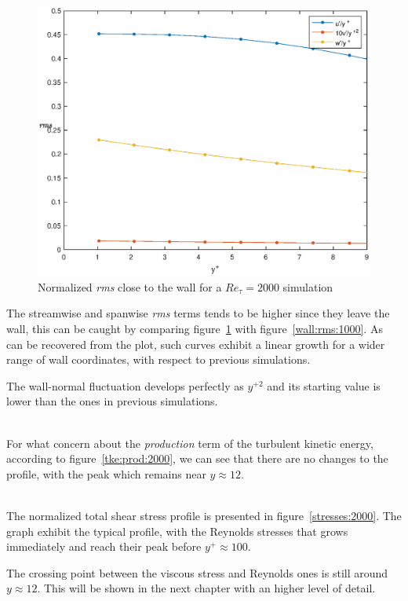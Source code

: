 \begin{figure}
\begin{center}
\includegraphics[scale=0.55]{grafici/wall_rms_2000.eps}
\caption{Normalized \emph{rms} close to the wall for a $Re_{\tau}=2000$ simulation}
\label{wall:rms:2000}
\end{center} 
\end{figure}

The streamwise and spanwise \emph{rms} terms tends to be higher since they leave the wall, this can be caught by comparing figure~\ref{wall:rms:2000} with figure~\ref{wall:rms:1000}. As can be recovered from the plot, such curves exhibit a linear growth for a wider range of wall coordinates, with respect to previous simulations. \par
The wall-normal fluctuation develops perfectly as $y^{+2}$ and its starting value is lower than the ones in previous simulations.\\~\par


For what concern about the \emph{production} term of the turbulent kinetic energy, according to figure~\ref{tke:prod:2000}, we can see that there are no changes to the profile, with the peak which remains near $y\approx12$. \\~\par

The normalized total shear stress profile is presented in figure~\ref{stresses:2000}. The graph exhibit the typical profile, with the Reynolds stresses that grows immediately and reach their peak before $y^{+}\approx 100$. \par
The crossing point between the viscous stress and Reynolds ones is still around $y\approx12$. This will be shown in the next chapter with an higher level of detail.


